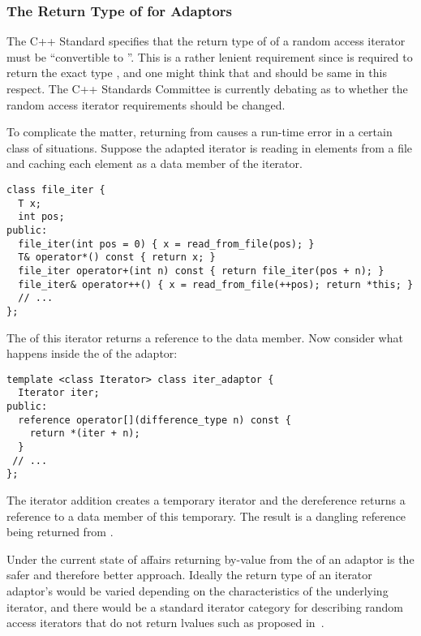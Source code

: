 \documentclass{netobjectdays}
\begin{document}
\subsubsection{The Return Type of  for Adaptors}

The C++ Standard specifies that the return type of 
of a random access iterator must be ``convertible to ''.  This
is a rather lenient requirement since  is required to
return the exact type , and one might think that
 and  should be same in this respect.
The C++ Standards Committee is currently debating as to whether the
random access iterator requirements should be changed.

To complicate the matter, returning  from 
causes a run-time error in a certain class of situations.  Suppose the
adapted iterator is reading in elements from a file and caching each
element as a data member of the iterator.  

{\footnotesize
\begin{verbatim}
class file_iter {
  T x;
  int pos;
public:
  file_iter(int pos = 0) { x = read_from_file(pos); }
  T& operator*() const { return x; }
  file_iter operator+(int n) const { return file_iter(pos + n); }
  file_iter& operator++() { x = read_from_file(++pos); return *this; }
  // ...
};
\end{verbatim}
}

\noindent The  of this iterator returns a reference to
the data member. Now consider what happens inside the
 of the adaptor:

{\footnotesize
\begin{verbatim}
template <class Iterator> class iter_adaptor {
  Iterator iter;
public:
  reference operator[](difference_type n) const {
    return *(iter + n);
  }
 // ...
};
\end{verbatim}
}

\noindent The iterator addition creates a temporary iterator and the
dereference returns a reference to a data member of this
temporary. The result is a dangling reference being returned from
.

Under the current state of affairs returning by-value from the
 of an adaptor is the safer and therefore better
approach.  Ideally the return type of an iterator adaptor's
 would be varied depending on the characteristics of
the underlying iterator, and there would be a standard iterator
category for describing random access iterators that do not return
lvalues such as proposed in~\cite{siek01:_improved_iter_cat}.
\end{document}
